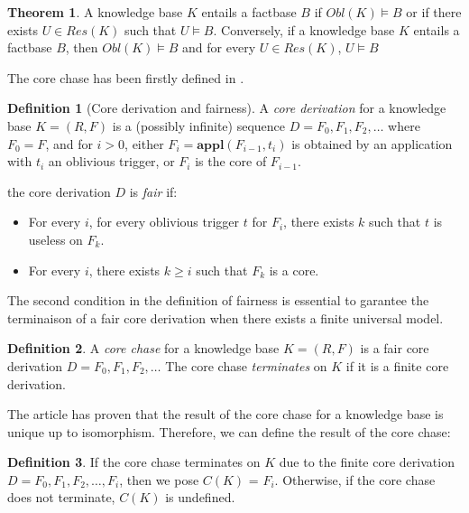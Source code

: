\documentclass{article}
\theoremstyle{definition}
\newtheorem{definition}{Definition}[section]
\newtheorem{theorem}{Theorem}[section]
\theoremstyle{remark}
\newcommand{\Appl}{\textbf{appl}}
\begin{document}
\begin{theorem}
A knowledge base $K$ entails a factbase $B$ if $\textit{Obl}(K) \models B$ or if there exists $U \in \textit{Res}(K)$ such that $U \models B$. Conversely, if a knowledge base $K$ entails a factbase $B$, then $\textit{Obl}(K) \models B$ and for every $U \in \textit{Res}(K)$, $U \models B$
\end{theorem}


The core chase has been firstly defined in \cite{core_chase}.

\begin{definition}[Core derivation and fairness]
A \emph{core derivation} for a knowledge base $K = (R,F)$ is a (possibly infinite) sequence $D = F_0, F_1, F_2, \ldots$ where $F_0 = F$, and for $i >0$, either $F_{i}= \Appl(F_{i-1},t_i)$ is obtained by an application with $t_i$ an oblivious trigger, or $F_i$ is the core of $F_{i-1}$. 

the core derivation $D$ is \emph{fair} if:
\begin{itemize}
\item For every $i$, for every oblivious trigger $t$ for $F_i$, there exists $k$ such that $t$ is useless on $F_k$.
\item For every $i$, there exists $k \geq i$ such that $F_k$ is a core.

\end{itemize}
\end{definition}

The second condition in the definition of fairness is essential to garantee the terminaison of a fair core derivation when there exists a finite universal model.

\begin{definition}
A \emph{core chase} for a knowledge base $K= (R,F)$ is a fair core derivation $D=F_0,F_1,F_2,\ldots$ The core chase \emph{terminates} on $K$ if it is a finite core derivation.
\end{definition}

The article \cite{core_chase} has proven that the result of the core chase for a knowledge base is unique up to isomorphism. Therefore, we can define the result of the core chase:

\begin{definition}
If the core chase terminates on $K$ due to the finite core derivation $D=F_0,F_1,F_2,\ldots,F_i$, then we pose \emph{$\textit{C}(K)$} = $F_i$. Otherwise, if the core chase does not terminate, $\textit{C}(K)$ is undefined.
\end{definition}
\end{document}
